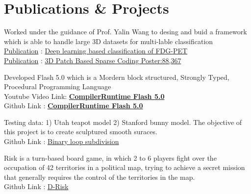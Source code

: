 \documentclass[hidelinks,letterpaper]{deedy-resume-openfont} %
\begin{document}
\begin{minipage}[t]{0.66\textwidth}
		\section{Publications \& Projects}
		
		
		Worked under the guidance of Prof. Yalin Wang to desing and buid a framework which is able to handle large 3D datasets for multi-lable classification \\
		\underline{Publication} : \href{https://www.spiedigitallibrary.org/conference-proceedings-of-spie/10572/105720J/Deep-learning-based-%20classification-of-FDG-PET-data-for-Alzheimers/10.1117/12.2294537.short?SSO=1}{Deep learning based classification of FDG-PET} \\
		\underline{Publication} : \href{http://azalz.org/wp-content/uploads/2017/05/2017_Annual-Report_FINAL_v2.pdf#page=367}{3D Patch Based Sparse Coding Poster:88,367}
		
		\sectionsep
		
		
		Developed Flash 5.0 which is a Mordern block structured, Strongly Typed, Procedural Programming Language\\
		Youtube Video Link: \href{https://www.youtube.com/watch?v=cSMFHlU0nXk}{\bf CompilerRuntime Flash 5.0} \\
		Github Link : \href{https://github.com/anantsrivastava30/CompilerRuntime}{\bf CompilerRuntime Flash 5.0}  
		
		\sectionsep
		
		Testing data: 1) Utah teapot model 2) Stanford bunny model. The objective of this project is to create sculptured smooth suraces. \\
		Github Link : \href{https://github.com/anantsrivastava30/Subdivision/blob/master/Subdivision/Subdivision.cpp}{Binary loop subdivision}
		
		\sectionsep
		
		Risk is a turn-based board game, in which 2 to 6 players fight over the occupation of 42 territories in a political map, trying to achieve a secret mission that generally requires the control of the territories in the map. \\
		Github Link : \href{https://github.com/ser515asu/DRisk-Team-MASCS/tree/master/riskmap}{ D-Risk}  
		

\end{minipage}
\end{document}
